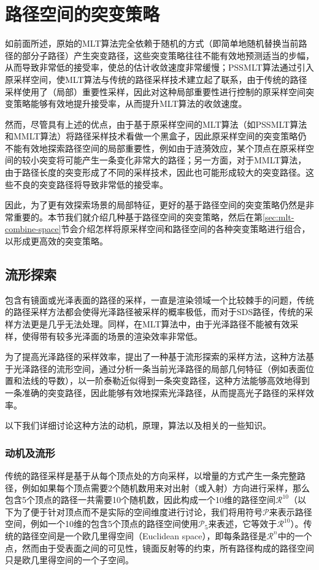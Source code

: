 \section{路径空间的突变策略}\label{sec:pt-manifold}
如前面所述，原始的MLT算法完全依赖于随机的方式（即简单地随机替换当前路径的部分子路径）产生突变路径，这些突变策略往往不能有效地预测适当的步幅，从而导致非常低的接受率，使总的估计收敛速度非常缓慢；PSSMLT算法通过引入原采样空间，使MLT算法与传统的路径采样技术建立起了联系，由于传统的路径采样使用了（局部）重要性采样，因此对这种局部重要性进行控制的原采样空间突变策略能够有效地提升接受率，从而提升MLT算法的收敛速度。

然而，尽管具有上述的优点，由于基于原采样空间的MLT算法（如PSSMLT算法和MMLT算法）将路径采样技术看做一个黑盒子，因此原采样空间的突变策略仍不能有效地探索路径空间的局部重要性，例如由于涟漪效应，某个顶点在原采样空间的较小突变将可能产生一条变化非常大的路径；另一方面，对于MMLT算法，由于路径长度的突变形成了不同的采样技术，因此也可能形成较大的突变路径。这些不良的突变路径将导致非常低的接受率。

因此，为了更有效探索场景的局部特征，更好的基于路径空间的突变策略仍然是非常重要的。本节我们就介绍几种基于路径空间的突变策略，然后在第\ref{sec:mlt-combine-space}节会介绍怎样将原采样空间和路径空间的各种突变策略进行组合，以形成更高效的突变策略。




\subsection{流形探索}\label{sec:mlt-me}
包含有镜面或光泽表面的路径的采样，一直是渲染领域一个比较棘手的问题，传统的路径采样方法都会使得光泽路径被采样的概率极低，而对于SDS路径，传统的采样方法更是几乎无法处理。同样，在MLT算法中，由于光泽路径不能被有效采样，使得带有较多光泽面的场景的渲染效率非常低。

为了提高光泽路径的采样效率，\cite{a:ManifoldExplorationAMarkovChainMonteCarloTechniqueforRenderingSceneswithDifficultSpecularTransport}提出了一种基于流形探索的采样方法，这种方法基于光泽路径的流形空间，通过分析一条当前光泽路径的局部几何特征（例如表面位置和法线的导数），以一阶泰勒近似得到一条突变路径，这种方法能够高效地得到一条准确的突变路径，因此能够有效地探索光泽路径，从而提高光子路径的采样效率。

以下我们详细讨论这种方法的动机，原理，算法以及相关的一些知识。



\subsubsection{动机及流形}\label{sec:mlt-manifold}
传统的路径采样是基于从每个顶点处的方向采样，以增量的方式产生一条完整路径，例如如果每个顶点需要2个随机数用来对出射（或入射）方向进行采样，那么包含5个顶点的路径一共需要10个随机数，因此构成一个10维的路径空间$\mathcal{R}^{10}$（以下为了便于针对顶点而不是实际的空间维度进行讨论，我们将用符号$\mathcal{P}$来表示路径空间，例如一个10维的包含5个顶点的路径空间使用$\mathcal{P}_5$来表述，它等效于$\mathcal{R}^{10}$）。传统的路径空间是一个欧几里得空间（Euclidean space），即每条路径是$\mathcal{R}^{n}$中的一个点，然而由于受表面之间的可见性，镜面反射等的约束，所有路径构成的路径空间只是欧几里得空间的一个子空间。


